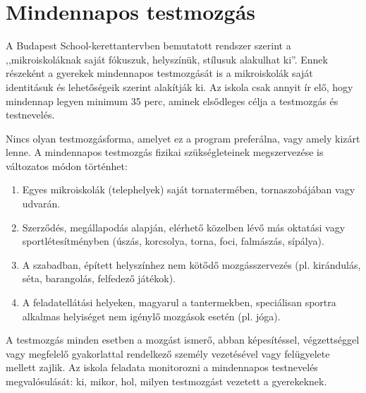 \section{Mindennapos testmozgás}
\label{sec:mindennapos-testmozgas}

A Budapest School-kerettantervben bemutatott rendszer szerint a ,,mikroiskoláknak saját fókuszuk, helyszínük, stílusuk alakulhat ki''. Ennek részeként a gyerekek mindennapos testmozgását is a mikroiskolák saját identitásuk és lehetőségeik szerint alakítják ki. Az iskola csak annyit ír elő, hogy mindennap legyen minimum 35 perc, aminek elsődleges célja a testmozgás és testnevelés.

Nincs olyan testmozgásforma, amelyet ez a program preferálna, vagy amely kizárt lenne. A mindennapos testmozgás fizikai szükségleteinek megszervezése is változatos módon történhet:
\begin{enumerate}
    \item Egyes mikroiskolák (telephelyek) saját tornatermében, tornaszobájában vagy udvarán.
    \item Szerződés, megállapodás alapján, elérhető közelben lévő más oktatási vagy sportlétesítményben (úszás, korcsolya, torna, foci, falmászás, sípálya).
    \item A szabadban, épített helyszínhez nem kötődő mozgásszervezés (pl. kirándulás, séta, barangolás, felfedező játékok).
    \item A feladatellátási helyeken, magyarul a tantermekben, speciálisan sportra alkalmas helyiséget nem igénylő mozgások esetén (pl. jóga).
\end{enumerate}

A testmozgás minden esetben a mozgást ismerő, abban képesítéssel, végzettséggel vagy megfelelő gyakorlattal rendelkező személy vezetésével vagy felügyelete mellett zajlik. Az iskola feladata monitorozni a mindennapos testnevelés megvalósulását: ki, mikor, hol, milyen testmozgást vezetett a gyerekeknek.
